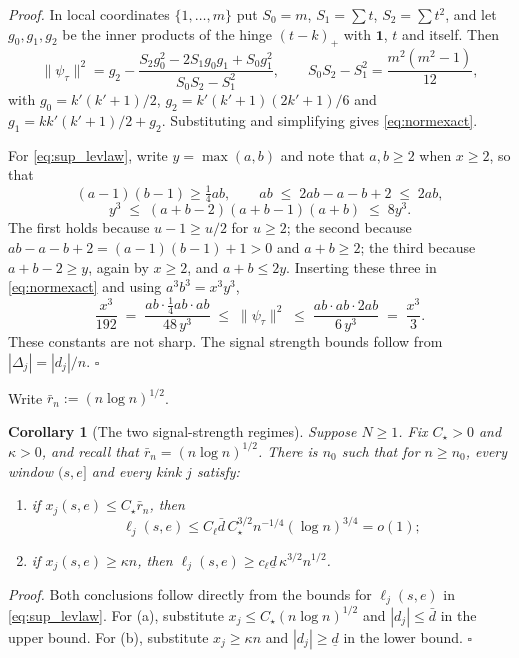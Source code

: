 \documentclass[12pt, a4paper]{article}
\newcommand{\qed}{\hfill$\square$}
\newenvironment{proof}[1][Proof]{\par\noindent\textit{#1.}\space}{\qed\par\medskip}
\newtheorem{cor}{Corollary}[section]
\begin{document}
\begin{proof}
In local coordinates $\{1,\ldots,m\}$ put $S_0 = m$, $S_1 = \sum t$,
$S_2 = \sum t^2$, and let $g_0,g_1,g_2$ be the inner products of the hinge
$(t-k)_+$ with $\mathbf 1$, $t$ and itself. Then
\[
\|\psi_\tau\|^2 = g_2 - \frac{S_2 g_0^2 - 2S_1 g_0 g_1 + S_0 g_1^2}
{S_0S_2 - S_1^2}, \qquad S_0S_2 - S_1^2 = \frac{m^2(m^2-1)}{12},
\]
with $g_0 = k'(k'+1)/2$, $g_2 = k'(k'+1)(2k'+1)/6$ and $g_1 = kk'(k'+1)/2 + g_2$. Substituting and simplifying gives \eqref{eq:normexact}.

For \eqref{eq:sup_levlaw}, write $y = \max(a,b)$ and note that $a, b \ge 2$ when $x \ge 2$, so that
\[
(a-1)(b-1) \ge \tfrac14 ab, \qquad
ab \;\le\; 2ab-a-b+2 \;\le\; 2ab,
\]
\[
y^3 \;\le\; (a+b-2)(a+b-1)(a+b) \;\le\; 8y^3 .
\]
The first holds because $u-1 \ge u/2$ for $u \ge 2$; the second because $ab-a-b+2 = (a-1)(b-1)+1 > 0$ and $a+b \ge 2$; the third because $a+b-2 \ge y$, again by $x \ge 2$, and $a+b \le 2y$. Inserting these three in \eqref{eq:normexact} and using $a^3b^3 = x^3y^3$,
\[
\frac{x^3}{192} \;=\; \frac{ab \cdot \tfrac14 ab \cdot ab}{48\,y^3}
\;\le\; \|\psi_\tau\|^2 \;\le\;
\frac{ab \cdot ab \cdot 2ab}{6\,y^3} \;=\; \frac{x^3}{3} .
\]
These constants are not sharp. The signal strength bounds follow from $|\Delta_j| = |d_j|/n$.
\end{proof}

Write $\bar r_n := (n\log n)^{1/2}$.

\begin{cor}[The two signal-strength regimes]
\label{cor:gap}
Suppose $N\ge1$. Fix $C_\star>0$ and $\kappa>0$, and recall that
$\bar r_n=(n\log n)^{1/2}$. There is $n_0$ such that for $n\ge n_0$, every
window $(s,e]$ and every kink $j$ satisfy:
\begin{enumerate}
\item[\emph{(a)}] if $x_j(s,e) \le C_\star \bar r_n$, then
\[
\ell_j(s,e) \le C_\ell \bar d\, C_\star^{3/2}
n^{-1/4}(\log n)^{3/4}=o(1);
\]
\item[\emph{(b)}] if $x_j(s,e) \ge \kappa n$, then
$\ell_j(s,e) \ge c_\ell \underline d\,\kappa^{3/2}n^{1/2}$.
\end{enumerate}
\end{cor}

\begin{proof}
Both conclusions follow directly from the bounds for $\ell_j(s,e)$ in
\eqref{eq:sup_levlaw}. For (a), substitute
$x_j\le C_\star(n\log n)^{1/2}$ and $|d_j|\le\bar d$ in the upper bound. For
(b), substitute $x_j\ge\kappa n$ and $|d_j|\ge\underline d$ in the lower bound.
\end{proof}
\end{document}
